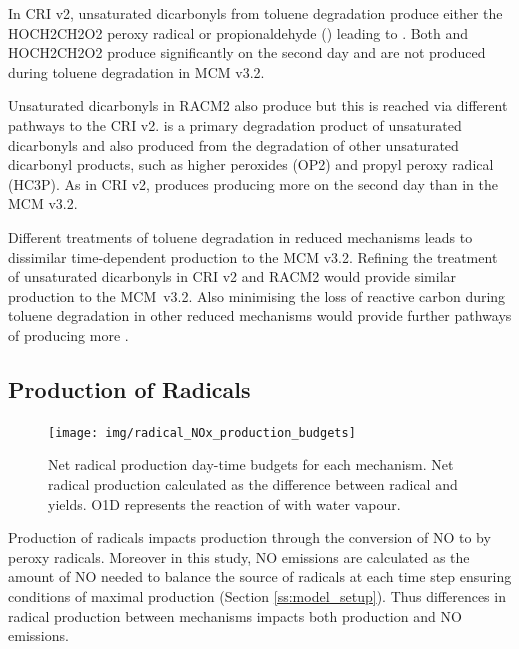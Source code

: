 In CRI v2, unsaturated dicarbonyls from toluene degradation produce either the HOCH2CH2O2 peroxy radical or propionaldehyde () leading to .
Both  and HOCH2CH2O2 produce  significantly on the second day and are not produced during toluene degradation in MCM v3.2.

Unsaturated dicarbonyls in RACM2 also produce  but this is reached via different pathways to the CRI v2.
 is a primary degradation product of unsaturated dicarbonyls and also produced from the degradation of other unsaturated dicarbonyl products, such as higher peroxides (OP2) and propyl peroxy radical (HC3P).
As in CRI v2,  produces  producing more  on the second day than in the MCM v3.2.

Different treatments of toluene degradation in reduced mechanisms leads to dissimilar time-dependent  production to the MCM v3.2.
Refining the treatment of unsaturated dicarbonyls in CRI v2 and RACM2 would provide similar  production to the \mbox{MCM v3.2}.
Also minimising the loss of reactive carbon during toluene degradation in other reduced mechanisms would provide further pathways of producing more .

\subsection{Production of Radicals} \label{ss:radicals}
\begin{figure}
    \centering
    \texttt{[image: img/radical\_NOx\_production\_budgets]}
    \vspace{0mm}
    \caption{Net radical production day-time budgets for each mechanism. Net radical production calculated as the difference between radical and  yields. O1D represents the reaction of  with water vapour.}
    \vspace{-4mm}
    \label{f:radical_production} 
\end{figure} 

Production of radicals impacts  production through the conversion of NO to  by peroxy radicals.
Moreover in this study, NO emissions are calculated as the amount of NO needed to balance the source of radicals at each time step ensuring conditions of maximal  production (Section \ref{ss:model_setup}).
Thus differences in radical production between mechanisms impacts both  production and NO emissions.


